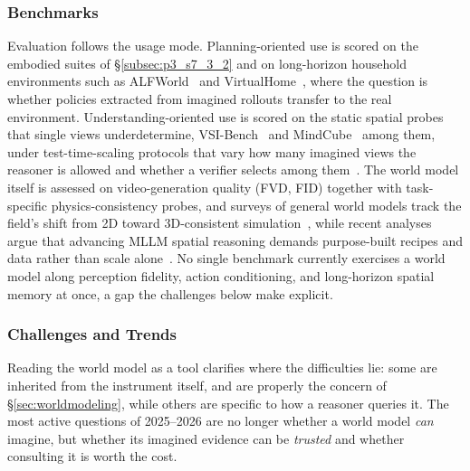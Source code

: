 \subsubsection{Benchmarks}
Evaluation follows the usage mode.
Planning-oriented use is scored on the embodied suites of §\ref{subsec:p3_s7_3_2} and on long-horizon household environments such as ALFWorld~\cite{shridhar2020alfworld} and VirtualHome~\cite{puig2018virtualhome}, where the question is whether policies extracted from imagined rollouts transfer to the real environment.
Understanding-oriented use is scored on the static spatial probes that single views underdetermine, VSI-Bench~\cite{yang2025vsibench} and MindCube~\cite{yin2025spatial} among them, under test-time-scaling protocols that vary how many imagined views the reasoner is allowed and whether a verifier selects among them~\cite{jha2025probing,yu2026avic}.
The world model itself is assessed on video-generation quality (FVD, FID) together with task-specific physics-consistency probes, and surveys of general world models track the field's shift from 2D toward 3D-consistent simulation~\cite{xie2025worldsurvey}, while recent analyses argue that advancing MLLM spatial reasoning demands purpose-built recipes and data rather than scale alone~\cite{zhang2025scaling}.
No single benchmark currently exercises a world model along perception fidelity, action conditioning, and long-horizon spatial memory at once, a gap the challenges below make explicit.


\subsubsection{Challenges and Trends}
Reading the world model as a tool clarifies where the difficulties lie: some are inherited from the instrument itself, and are properly the concern of §\ref{sec:worldmodeling}, while others are specific to how a reasoner queries it. The most active questions of 2025--2026 are no longer whether a world model \emph{can} imagine, but whether its imagined evidence can be \emph{trusted} and whether consulting it is worth the cost.

